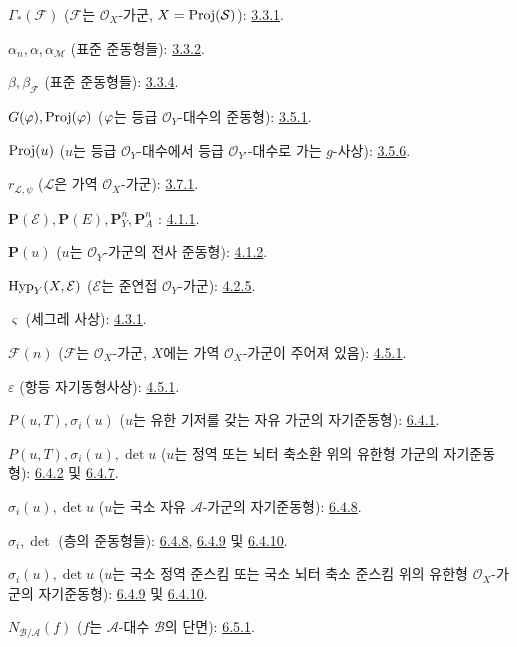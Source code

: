 $\Gamma_*(\mathcal{F})$ ($\mathcal{F}$는 $\mathcal{O}_X$-가군,
$X=\operatorname{Proj}(\mathcal{S})$): \hyperref[II.3.3.1-ko]{3.3.1}.

$\alpha_n,\alpha,\alpha_{\mathcal{M}}$ (표준 준동형들): \hyperref[II.3.3.2-ko]{3.3.2}.

$\beta,\beta_{\mathcal{F}}$ (표준 준동형들): \hyperref[II.3.3.4-ko]{3.3.4}.

$G(\varphi),\operatorname{Proj}(\varphi)$
($\varphi$는 등급 $\mathcal{O}_Y$-대수의 준동형): \hyperref[II.3.5.1-ko]{3.5.1}.

$\operatorname{Proj}(u)$ ($u$는 등급 $\mathcal{O}_Y$-대수에서
등급 $\mathcal{O}_{Y'}$-대수로 가는 $g$-사상): \hyperref[II.3.5.6-ko]{3.5.6}.

$r_{\mathcal{L},\psi}$ ($\mathcal{L}$은 가역 $\mathcal{O}_X$-가군): \hyperref[II.3.7.1-ko]{3.7.1}.

$\mathbf{P}(\mathcal{E}),\mathbf{P}(E),\mathbf{P}_Y^n,\mathbf{P}_A^n$ : \hyperref[II.4.1.1-ko]{4.1.1}.

$\mathbf{P}(u)$ ($u$는 $\mathcal{O}_Y$-가군의 전사 준동형): \hyperref[II.4.1.2-ko]{4.1.2}.

$\operatorname{Hyp}_Y(X,\mathcal{E})$ ($\mathcal{E}$는 준연접 $\mathcal{O}_Y$-가군): \hyperref[II.4.2.5-ko]{4.2.5}.

$\varsigma$ (세그레 사상): \hyperref[II.4.3.1-ko]{4.3.1}.

$\mathcal{F}(n)$ ($\mathcal{F}$는 $\mathcal{O}_X$-가군, $X$에는
가역 $\mathcal{O}_X$-가군이 주어져 있음): \hyperref[II.4.5.1-ko]{4.5.1}.

$\varepsilon$ (항등 자기동형사상): \hyperref[II.4.5.1-ko]{4.5.1}.

$P(u,T),\sigma_i(u)$ ($u$는 유한 기저를 갖는 자유 가군의 자기준동형): \hyperref[II.6.4.1-ko]{6.4.1}.

$P(u,T),\sigma_i(u),\det u$
($u$는 정역 또는 뇌터 축소환 위의 유한형 가군의 자기준동형):
\hyperref[II.6.4.2-ko]{6.4.2} 및 \hyperref[II.6.4.7-ko]{6.4.7}.

$\sigma_i(u),\det u$ ($u$는 국소 자유 $\mathcal{A}$-가군의 자기준동형): \hyperref[II.6.4.8-ko]{6.4.8}.

$\sigma_i,\det$ (층의 준동형들): \hyperref[II.6.4.8-ko]{6.4.8}, \hyperref[II.6.4.9-ko]{6.4.9} 및 \hyperref[II.6.4.10-ko]{6.4.10}.

$\sigma_i(u),\det u$
($u$는 국소 정역 준스킴 또는 국소 뇌터 축소 준스킴 위의
유한형 $\mathcal{O}_X$-가군의 자기준동형):
\hyperref[II.6.4.9-ko]{6.4.9} 및 \hyperref[II.6.4.10-ko]{6.4.10}.

$N_{\mathcal{B}/\mathcal{A}}(f)$
($f$는 $\mathcal{A}$-대수 $\mathcal{B}$의 단면): \hyperref[II.6.5.1-ko]{6.5.1}.

